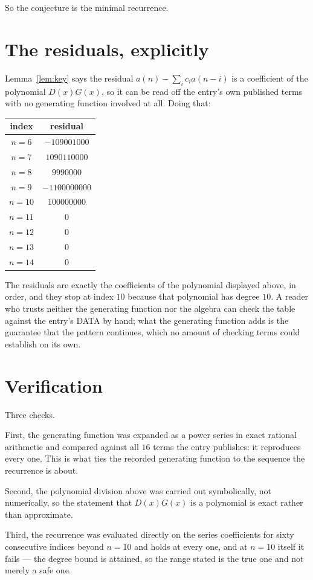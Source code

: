 \documentclass[11pt,a4paper]{article}
\theoremstyle{plain}
\theoremstyle{definition}
\begin{document}
So the conjecture is the minimal recurrence.

\section{The residuals, explicitly}

Lemma~\ref{lem:key} says the residual $a(n)-\sum_ic_ia(n-i)$ is a coefficient of the
polynomial $D(x)G(x)$, so it can be read off the entry's own published terms with no
generating function involved at all. Doing that:
\begin{center}
\begin{tabular}{cc}
index & residual \\ \hline
$n=6$ & $-109001000$ \\
$n=7$ & $1090110000$ \\
$n=8$ & $9990000$ \\
$n=9$ & $-1100000000$ \\
$n=10$ & $100000000$ \\
$n=11$ & $0$ \\
$n=12$ & $0$ \\
$n=13$ & $0$ \\
$n=14$ & $0$
\end{tabular}
\end{center}
The residuals are exactly the coefficients of the polynomial displayed above, in order, and
they stop at index $10$ because that polynomial has degree $10$. A reader who trusts
neither the generating function nor the algebra can check the table against the entry's DATA
by hand; what the generating function adds is the guarantee that the pattern continues, which
no amount of checking terms could establish on its own.

\section{Verification}

Three checks.

First, the generating function was expanded as a power series in exact rational arithmetic and
compared against all $16$ terms the entry publishes: it reproduces every one. This is
what ties the recorded generating function to the sequence the recurrence is about.

Second, the polynomial division above was carried out symbolically, not numerically, so the
statement that $D(x)G(x)$ is a polynomial is exact rather than approximate.

Third, the recurrence was evaluated directly on the series coefficients for sixty consecutive
indices beyond $n=10$ and holds at every one, and at $n=10$ itself it fails --- the
degree bound is attained, so the range stated is the true one and not merely a safe one.
\end{document}

